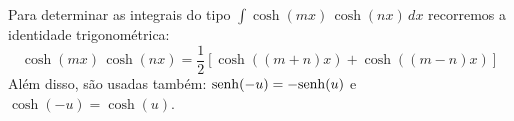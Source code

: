\cleardoublepage\documentclass[../main.tex]{subfiles}
\begin{document}
\subsection[\formula{Integrais do tipo $\int  \cosh(mx)\,\cosh(nx)\,dx$}]{}
Para determinar as integrais do tipo $\int  \cosh(mx)\,\cosh(nx)\,dx$ recorremos a identidade trigonométrica:
\begin{equation}
   \cosh(mx)\,\cosh(nx)= \dfrac{1}{2}\left[ \cosh((m+n)x) +\cosh((m-n)x)\right]
\end{equation}
Além disso, são usadas também: \({\rm senh}(-u)=-{\rm senh}(u)\) e \(\cosh(-u)=\cosh(u)\).
\end{document}
